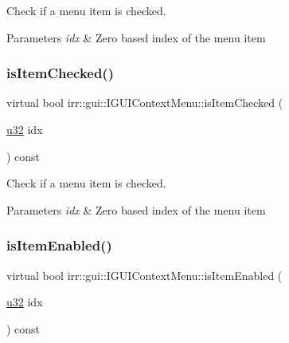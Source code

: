 Check if a menu item is checked. 


\begin{DoxyParams}{Parameters}
{\em idx} & Zero based index of the menu item \\
\hline
\end{DoxyParams}
\mbox{\label{classirr_1_1gui_1_1IGUIContextMenu_a0ff910b79e5581a97aee8ec9a0679160}} 
\subsubsection{\texorpdfstring{is\+Item\+Checked()}{isItemChecked()}\hspace{0.1cm}{\footnotesize\ttfamily [2/2]}}
{\footnotesize\ttfamily virtual bool irr\+::gui\+::\+I\+G\+U\+I\+Context\+Menu\+::is\+Item\+Checked (\begin{DoxyParamCaption}\item[{\hyperlink{namespaceirr_a0416a53257075833e7002efd0a18e804}{u32}}]{idx }\end{DoxyParamCaption}) const\hspace{0.3cm}{\ttfamily [pure virtual]}}



Check if a menu item is checked. 


\begin{DoxyParams}{Parameters}
{\em idx} & Zero based index of the menu item \\
\hline
\end{DoxyParams}
\mbox{\label{classirr_1_1gui_1_1IGUIContextMenu_a0064345c63e1f8e124e64ca96eb486e2}} 
\subsubsection{\texorpdfstring{is\+Item\+Enabled()}{isItemEnabled()}\hspace{0.1cm}{\footnotesize\ttfamily [1/2]}}
{\footnotesize\ttfamily virtual bool irr\+::gui\+::\+I\+G\+U\+I\+Context\+Menu\+::is\+Item\+Enabled (\begin{DoxyParamCaption}\item[{\hyperlink{namespaceirr_a0416a53257075833e7002efd0a18e804}{u32}}]{idx }\end{DoxyParamCaption}) const\hspace{0.3cm}{\ttfamily [pure virtual]}}



